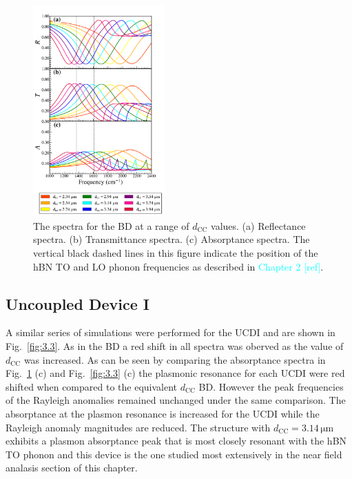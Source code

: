 \documentclass[preprint,
amsmath,amssymb,
aip,
jap,
floatfix,]{revtex4-2}
\begin{document}
			\begin{figure}[!htb]
			  \centering\includegraphics[width=0.45\textwidth]{Figures/BareRTA1000_2400.png}
			  \caption{The spectra for the BD at a range of $d_\mathrm{CC}$ values. (a) Reflectance spectra. (b) Transmittance spectra. (c) Absorptance spectra.  The vertical black dashed lines in this figure indicate the position of the hBN TO and LO phonon frequencies as described in \textcolor{cyan}{Chapter 2 [ref]}.}
			  \label{fig:3.2}
			\end{figure}

		\subsection{Uncoupled Device I}
		\label{sec:UCDI}
			A similar series of simulations were performed for the UCDI and are shown in Fig.~\ref{fig:3.3}. As in the BD a red shift in all spectra was oberved as the value of $d_\mathrm{CC}$ was increased. As can be seen by comparing the absorptance spectra in Fig.~\ref{fig:3.2} (c) and Fig.~\ref{fig:3.3} (c) the plasmonic resonance for each UCDI were red shifted when compared to the equivalent $d_\mathrm{CC}$ BD. However the peak frequencies of the Rayleigh anomalies remained unchanged under the same comparison. The absorptance at the plasmon resonance is increased for the UCDI while the Rayleigh anomaly magnitudes are reduced. The structure with $d_\mathrm{CC} = 3.14\,\si{\um}$ exhibits a plasmon absorptance peak that is most closely resonant with the hBN TO phonon and this device is the one studied most extensively in the near field analasis section of this chapter.
\end{document}
